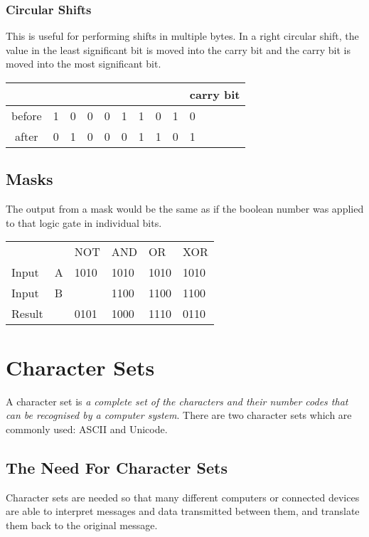 \documentclass[a4paper,11pt, twocolumn]{article}
\begin{document}
\subsubsection{Circular Shifts}
This is useful for performing shifts in multiple bytes. In a right circular shift, the value in the least significant bit is moved into the carry bit and the carry bit is moved into the most significant bit. 
\begin{table}[H]
    \centering
    \begin{tabularx}{0.9\linewidth}{c | c c c c c c c c | | X}
         &  &  &  &  &  &  &  &  & carry bit\\
         \hline
        before & 1 & 0 & 0 & 0 & 1 & 1 & 0 & 1 & 0 \\
        after & 0 & 1 & 0 & 0 & 0 & 1 & 1 & 0 & 1
    \end{tabularx}
\end{table}
\subsection{Masks}
The output from a mask would be the same as if the boolean number was applied to that logic gate in individual bits. 
\begin{table}[H]
\begin{tabularx}{0.45\textwidth}{XXllll}
 &  & NOT & AND & OR & XOR \\
Input & A & 1010 & 1010 & 1010 & 1010 \\
Input & B &  & 1100 & 1100 & 1100 \\ \cline{3-6} 
Result &  & 0101 & 1000 & 1110 & 0110 \\ \cline{3-6} 
\end{tabularx}
\end{table}

\section{Character Sets}
A character set is \textit{a complete set of the characters and their number codes that can be recognised by a computer system}.
There are two character sets which are commonly used: ASCII and Unicode.
\subsection{The Need For Character Sets}
Character sets are needed so that many different computers or connected devices are able to interpret messages and data transmitted between them, and translate them back to the original message.
\end{document}

